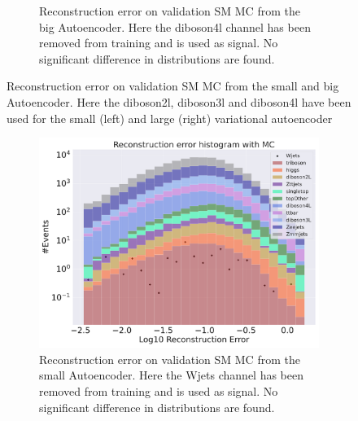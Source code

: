 \begin{figure}[H]
\begin{subfigure}{.45\textwidth}
        \caption{Reconstruction error on validation SM MC from the big Autoencoder. Here the diboson4l channel has been removed from training and 
        is used as signal. No significant difference in distributions are found. }
        \label{fig:vae_big_diboson4l}
    \end{subfigure}
    \hfill  
    \caption[VAE | Channel removal, diboson2l, diboson3l, diboson4l]{Reconstruction error on validation SM MC from the small and big Autoencoder. 
    Here the diboson2l, diboson3l and diboson4l have been used for the small (left) and large (right) variational autoencoder}
    \label{fig:vae_big_channel3}
\end{figure}


\begin{figure}[H]
    \centering
    \begin{subfigure}{.45\textwidth}
        \includegraphics[width=\textwidth]{Figures/VAE_testing/small/b_data_recon_big_rm3_feats_sig_Wjets.pdf}
        \caption{Reconstruction error on validation SM MC from the small Autoencoder. Here the Wjets channel has been removed from training and 
        is used as signal. No significant difference in distributions are found.}
        \label{fig:vae_small_Wjets}
    \end{subfigure}
    \hfill 
    \begin{subfigure}{.45\textwidth}

\end{subfigure}
\end{figure}

